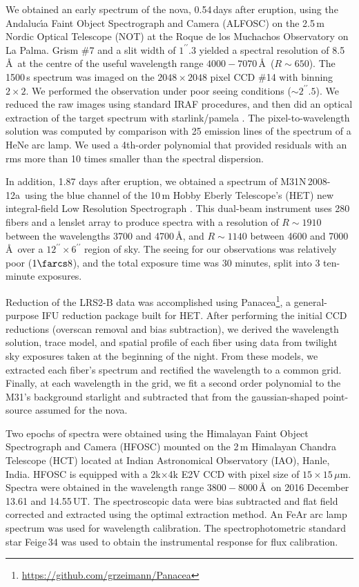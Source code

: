 \documentclass[twocolumn,tighten]{aastex6}
\def\novak{{M31N\,2008-12a}}
\begin{document}
We obtained an early spectrum of the nova, 0.54\,days after eruption, using the Andaluc\'\i a Faint Object Spectrograph and Camera (ALFOSC) on the 2.5\,m Nordic Optical Telescope (NOT) at the Roque de los Muchachos Observatory on La Palma. Grism \#7 and a slit width of $1^{\prime\prime}\!\!.3$ yielded a spectral resolution of 8.5\,\AA\ at the centre of the useful wavelength range $4000-7070$\,\AA\ ($R \sim 650$). The 1500\,s spectrum was imaged on the $2048 \times 2048$ pixel CCD \#14 with binning $2 \times 2$. We performed the observation under poor seeing conditions ($\sim 2^{\prime\prime}\!\!.5$). We reduced the raw images using standard IRAF procedures, and then did an optical extraction of the target spectrum with {\sc starlink}/{\sc pamela} \citep{1989PASP..101.1032M}. The pixel-to-wavelength solution was computed by comparison with 25 emission lines of the spectrum of a HeNe arc lamp. We used a 4th-order polynomial that provided residuals with an rms more than 10 times smaller than the spectral dispersion.

In addition, 1.87 days after eruption, we obtained a spectrum of \novak\ using the blue channel of the 10\,m Hobby Eberly Telescope's (HET) new integral-field Low Resolution Spectrograph \citep[LRS2-B;][]{2014SPIE.9147E..0AC,2016SPIE.9908E..4CC}.  This dual-beam instrument uses 280 fibers and a lenslet array to produce spectra with a resolution of $R \sim 1910$ between the wavelengths 3700 and 4700\,\AA,  and $R \sim 1140$ between 4600 and 7000\,\AA\ over a $12^{\prime\prime} \times 6^{\prime\prime}$ region of sky. The seeing for our observations was relatively poor ($1\farcs 8$), and the total exposure time was 30 minutes, split into 3 ten-minute exposures.  

Reduction of the LRS2-B data was accomplished using Panacea\footnote{\url{https://github.com/grzeimann/Panacea}}, a general-purpose IFU reduction package built for HET. After performing the initial CCD reductions (overscan removal and bias subtraction), we derived the wavelength solution, trace model, and spatial profile of each fiber using data from twilight sky exposures taken at the beginning of the night.  From these models, we extracted each fiber's spectrum and rectified the wavelength to a common grid.  Finally, at each wavelength in the grid, we fit a second order polynomial to the M31's background starlight and subtracted that from the gaussian-shaped point-source assumed for the nova.  

Two epochs of spectra were obtained using the Himalayan Faint Object Spectrograph and Camera (HFOSC) mounted on the 2\,m Himalayan Chandra Telescope (HCT) located at Indian Astronomical Observatory (IAO), Hanle, India. HFOSC is equipped with a 2k$\times$4k E2V CCD with pixel size of $15\times15$\,$\mu$m. Spectra were obtained in the wavelength range $3800-8000$\,\AA\ on 2016 December 13.61 and 14.55\,UT. The spectroscopic data were bias subtracted and flat field corrected and extracted using the optimal extraction method. An FeAr arc lamp spectrum was used for wavelength calibration. The spectrophotometric standard star Feige\,34 was used to obtain the instrumental response for flux calibration.
\end{document}
